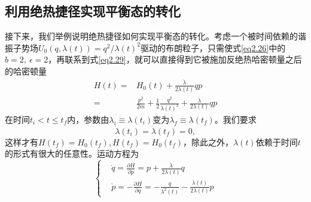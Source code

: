 \subsection{利用绝热捷径实现平衡态的转化}

\qquad 接下来，我们举例说明绝热捷径如何实现平衡态的转化。\cite{Tu2013}考虑一个被时间依赖的谐振子势场$U_0 (q, \lambda(t))= q^{2} /  \lambda(t)^2$驱动的布朗粒子，只需使式\eqref{eq2.26}中的$b=2,\ \epsilon=2$，再联系到式\eqref{eq2.29}，就可以直接得到它被施加反绝热哈密顿量之后的哈密顿量
\begin{equation}
    \begin{split}
    H(t)=&H_0 (t) + \frac{\dot{\lambda}}{2 \lambda(t)} q p\\
    =&\frac{p^{2}}{2 m}+\frac{1}{2}\frac{q^2}{\lambda(t)^2}+\frac{\dot{\lambda}}{2 \lambda(t)} q p
    \end{split}
    \label{eq2.31}
\end{equation}
在时间$t_i < t \leq t_f$内，参数由$\lambda_{i} \equiv \lambda(t_i)$变为$\lambda_{f} \equiv \lambda(t_f)$。我们要求
\begin{equation}
    \dot{\lambda}\left(t_{i}\right)=\dot{\lambda}\left(t_{f}\right)=0,
    \label{eq2.31.5}
\end{equation}
这样才有$H\left(t_{f}\right)=H_0 \left(t_{f}\right), H\left(t_{f}\right)=H_0 \left(t_{f}\right)$，除此之外，$\lambda (t)$依赖于时间$t$的形式有很大的任意性。运动方程为
\begin{equation}
    \left\{\begin{aligned}
        &\dot{q}=\frac{\partial H}{\partial p}={p}+\frac{\dot{\lambda}}{2 \lambda(t)} q \\
        &\dot{p}=-\frac{\partial H}{\partial q}=-\frac{q}{\lambda^{2}(t)}-\frac{\dot{\lambda}(t)}{2 \lambda(t)} p
        \end{aligned}\right.
    \label{eq2.31.7}
\end{equation}


